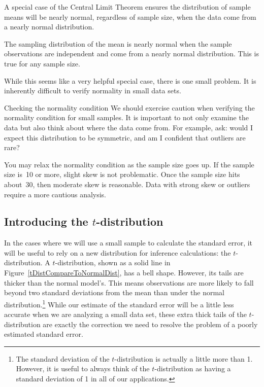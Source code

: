 A special case of the Central Limit Theorem ensures the distribution of sample means will be nearly normal, regardless of sample size, when the data come from a nearly normal distribution.

\begin{termBox}{
The sampling distribution of the mean is nearly normal when the sample observations are independent and come from a nearly normal distribution. This is true for any sample size.
}
\end{termBox}

While this seems like a very helpful special case, there is one small problem. It is inherently difficult to verify normality in small data sets.

\begin{caution}
{Checking the normality condition}
{We should exercise caution when verifying the normality condition for small samples. It is important to not only examine the data but also think about where the data come from. For example, ask: would I expect this distribution to be symmetric, and am I confident that outliers are rare?}
\end{caution}

You may relax the normality condition as the sample size goes up. If the sample size is~10 or more, slight skew is not problematic. Once the sample size hits about~30, then moderate skew is reasonable. Data with strong skew or outliers require a more cautious analysis.


\subsection{Introducing the $t$-distribution}
\label{introducingTheTDistribution}


In the cases where we will use a small sample to calculate the standard error, it will be useful to rely on a new distribution for inference calculations: the $t$-distribution. A $t$-distribution, shown as a solid line in Figure~\ref{tDistCompareToNormalDist}, has a bell shape. However, its tails are thicker than the normal model's. This means observations are more likely to fall beyond two standard deviations from the mean than under the normal distribution.\footnote{The standard deviation of the $t$-distribution is actually a little more than 1. However, it is useful to always think of the $t$-distribution as having a standard deviation of 1 in all of our applications.} While our estimate of the standard error will be a little less accurate when we are analyzing a small data set, these extra thick tails of the $t$-distribution are exactly the correction we need to resolve the problem of a poorly estimated standard error.

